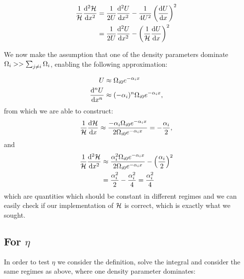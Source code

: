     \begin{equation}
        \begin{split}
            \frac{1}{\mathcal{H}}\dv[2]{\mathcal{H}}{x} &= \frac{1}{2U}\dv[2]{U}{x} - \frac{1}{4U^2}\left(\dv{U}{x}\right)^2 \\
            &= \frac{1}{2U}\dv[2]{U}{x}-\left(\frac{1}{\mathcal{H}}\dv{U}{x}\right)^2
        \end{split}
    \end{equation}

    We now make the assumption that one of the density parameters dominate $\Omega_i>> \sum_{j\neq i}\Omega_i$, enabling the following approximation:
    
    \begin{equation}
        \begin{split}
            U &\approx \Omega_{i0}e^{-\alpha_ix} \\
            \dv[n]{U}{x} &\approx (-\alpha_i)^n\Omega_{i0}e^{-\alpha_ix},
        \end{split}
    \end{equation}
    from which we are able to construct:
    \begin{equation}
        \frac{1}{\mathcal{H}}\dv{\mathcal{H}}{x} \approx \frac{-\alpha_i\Omega_{i0}e^{-\alpha_ix}}{2\Omega_{i0}e^{-\alpha_ix}} = -\frac{\alpha_i}{2},
    \end{equation}
    and
    \begin{equation}
        \begin{split}
            \frac{1}{\mathcal{H}}\dv[2]{\mathcal{H}}{x} &\approx \frac{\alpha_i^2\Omega_{i0}e^{-\alpha_ix}}{2\Omega_{i0}e^{-\alpha_ix}} - \left(\frac{\alpha_i}{2}\right)^2 \\
            &= \frac{\alpha_i^2}{2} - \frac{\alpha_i^2}{4} = \frac{\alpha_i^2}{4}
        \end{split}
    \end{equation}
    which are quantities which should be constant in different regimes and we can easily check if our implementation of $\mathcal{H}$ is correct, which is exactly what we sought. 

\subsection{For $\eta$}

    In order to test $\eta$ we consider the definition, solve the integral and consider the same regimes as above, where one density parameter dominates:

